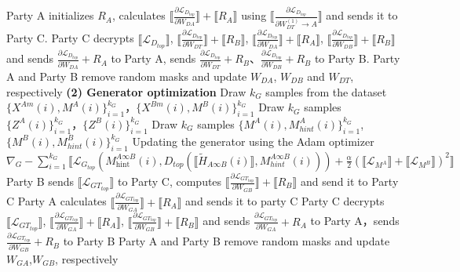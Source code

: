 \documentclass[final,1p,times]{elsarticle}
\begin{document}
\begin{algorithm}
\begin{algorithmic}[1]
		\State Party A initializes $R_A$, calculates $\llbracket \frac{\partial \mathcal{L}_{D_{top}}}{\partial W_{DA}} \rrbracket + \llbracket R_A \rrbracket$ using $\llbracket \frac{\partial \mathcal{L}_{D_{top}}}{\partial W_{DT}^{(1)} \to A} \rrbracket$ and sends it to Party C.
		\State Party C decrypts $\llbracket\mathcal{L}_{{D}_{{top}}}\rrbracket$, $\llbracket \frac{\partial \mathcal{L}_{D_{top}}}{\partial W_{DT}} \rrbracket + \llbracket R_B \rrbracket$, $\llbracket \frac{\partial \mathcal{L}_{D_{top}}}{\partial W_{DA}} \rrbracket + \llbracket R_A \rrbracket$, $\llbracket \frac{\partial \mathcal{L}_{D_{top}}}{\partial W_{DB}} \rrbracket + \llbracket R_B \rrbracket$ and sends $\frac{\partial \mathcal{L}_{D_{top}}}{\partial W_{DA}} + R_A$ to Party A, sends $\frac{\partial \mathcal{L}_{D_{top}}}{\partial W_{DT}} + R_B$、$\frac{\partial \mathcal{L}_{D_{top}}}{\partial W_{DB}} + R_B$ to Party B.
		\State Party A and Party B remove random masks and update $W_{DA}$, $W_{DB}$ and $W_{DT}$, respectively
		\State \textbf{(2) Generator optimization}
		\State  Draw $k_G$ samples from the dataset $\{X^{Am}(i), M^A (i)\}_{i=1}^{k_G}$，$\{X^{Bm}(i), M^B (i)\}_{i=1}^{k_G}$
		\State Draw $k_G$ samples $\{Z^A (i)\}_{i=1}^{k_G}$，$\{Z^B (i)\}_{i=1}^{k_G}$
		\State Draw $k_G$ samples $\{M^A (i), M_{hint}^A (i)\}_{i=1}^{k_G}$, $\{M^B (i), M_{hint}^B (i)\}_{i=1}^{k_G}$	
		\State Updating the generator using the Adam optimizer
		\State $\nabla_G - \sum_{i=1}^{k_G} \llbracket \mathcal{L}_{G_{top}} \left( M_{\text{hint}}^{A \infty B} (i), D_{top} \left( \llbracket \tilde{H}_{A \infty B} (i) \rrbracket, M_{hint}^{A \infty B} (i) \right) \right) + \frac{\alpha}{2} \left( \llbracket \mathcal{L}_{M^A} \rrbracket + \llbracket \mathcal{L}_{M^B} \rrbracket \right)^2 \rrbracket$
		\State Party B sends $\llbracket \mathcal{L}_{GT_{top}} \rrbracket$ to Party C, computes $\llbracket \frac{\partial \mathcal{L}_{GT_{\text{top}}}}{\partial W_{GB}} \rrbracket + \llbracket R_B \rrbracket$ and send it to Party C
		\State Party A calculates $\llbracket \frac{\partial \mathcal{L}_{GT_{top}}}{\partial W_{GA}} \rrbracket + \llbracket R_A \rrbracket$ and sends it to party C
		\State Party C decrypts $\llbracket \mathcal{L}_{GT_{top}} \rrbracket$, $\llbracket \frac{\partial \mathcal{L}_{GT_{top}}}{\partial W_{GA}} \rrbracket + \llbracket R_A \rrbracket$, $\llbracket \frac{\partial \mathcal{L}_{GT_{top}}}{\partial W_{GB}} \rrbracket + \llbracket R_B \rrbracket$ and sends $\frac{\partial \mathcal{L}_{GT_{top}}}{\partial W_{GA}} + R_A$ to Party A，sends $\frac{\partial \mathcal{L}_{GT_{top}}}{\partial W_{GB}} + R_B$ to Party B
		\State Party A and Party B remove random masks and update $W_{GA}$,$W_{GB}$, respectively
		\EndWhile		
	\end{algorithmic}
\end{algorithm}
\end{document}
